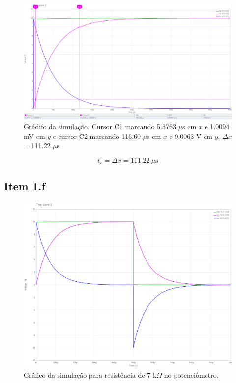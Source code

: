 \documentclass[11pt]{article}
\begin{document}
\begin{figure}[h!]
  \centering
  \includegraphics[width=\textwidth]{fig/1-e}
  \caption{Grádifo da simulação. Cursor C1 marcando 5.3763 $\mu$s em $x$ e 1.0094 mV em $y$ e cursor C2 marcando 116.60 $\mu$s em $x$ e 9.0063 V em $y$. $\Delta x$ = 111.22 $\mu$s}
\end{figure}

$$
  t_{r} = \Delta x = 111.22\ \mu\text{s}
$$

\pagebreak

\subsection*{Item 1.f}

\begin{figure}[h!]
  \centering
  \includegraphics[width=.8\textwidth]{fig/1-p-70}
  \caption{Gráfico da simulação para resistência de 7 k$\Omega$ no potenciômetro.}
\end{figure}
\end{document}
